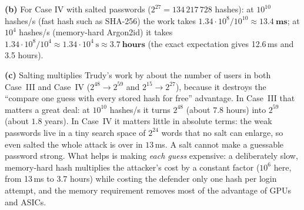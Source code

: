 \documentclass[11pt,a4paper]{article}
\begin{document}
\textbf{(b)} For Case IV with salted passwords ($2^{27}=134\,217\,728$ hashes):
at $10^{10}$ hashes/s (fast hash such as SHA-256) the work takes $1.34\cdot 10^{8}/10^{10}\approx
\mathbf{13.4\ ms}$; at $10^{4}$ hashes/s (memory-hard Argon2id) it takes $1.34\cdot 10^{8}/10^{4}\approx
1.34\cdot 10^{4}\ \text{s}\approx \mathbf{3.7\ hours}$ (the exact expectation gives 12.6\,ms and 3.5 hours).

\textbf{(c)} Salting multiplies Trudy's work by about the number of users in both Case~III and Case~IV
($2^{48}\to2^{59}$ and $2^{15}\to2^{27}$), because it destroys the ``compare one guess with every stored hash for
free'' advantage. In Case~III that matters a great deal: at $10^{10}$ hashes/s it turns $2^{48}$ (about
$7.8$ hours) into $2^{59}$ (about $1.8$ years). In Case~IV it matters little in absolute terms: the weak
passwords live in a tiny search space of $2^{24}$ words that no salt can enlarge, so even salted the whole
attack is over in $13$\,ms. A salt cannot make a guessable password strong. What helps is making \emph{each
guess} expensive: a deliberately slow, memory-hard hash multiplies the attacker's cost by a constant
factor ($10^{6}$ here, from 13\,ms to 3.7 hours) while costing the defender only one hash per login
attempt, and the memory requirement removes most of the advantage of GPUs and ASICs.
\end{document}
